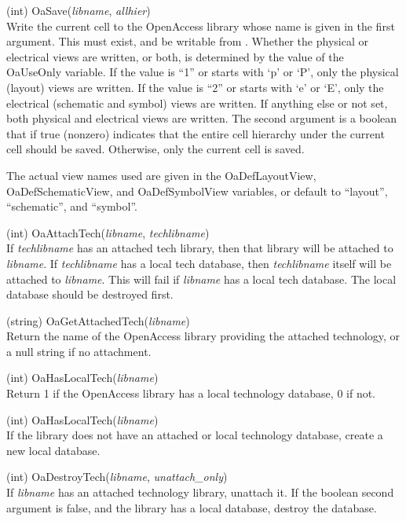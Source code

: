 \begin{description}
\item{(int) \vt OaSave({\it libname\/}, {\it allhier\/})}\\
Write the current cell to the OpenAccess library whose name is given
in the first argument.  This must exist, and be writable from {\Xic}. 
Whether the physical or electrical views are written, or both, is
determined by the value of the {\et OaUseOnly} variable.  If the value
is ``1'' or starts with `p' or `P', only the physical (layout) views
are written.  If the value is ``2'' or starts with `e' or `E', only
the electrical (schematic and symbol) views are written.  If anything
else or not set, both physical and electrical views are written.  The
second argument is a boolean that if true (nonzero) indicates that the
entire cell hierarchy under the current cell should be saved. 
Otherwise, only the current cell is saved.
 
The actual view names used are given in the {\et OaDefLayoutView},
{\et OaDefSchematicView}, and {\et OaDefSymbolView} variables, or
default to ``layout'', ``schematic'', and ``symbol''.

\item{(int) \vt OaAttachTech({\it libname\/}, {\it techlibname\/})}\\
If {\it techlibname} has an attached tech library, then that library
will be attached to {\it libname}.  If {\it techlibname} has a local
tech database, then {\it techlibname} itself will be attached to {\it
libname}.  This will fail if {\it libname} has a local tech database. 
The local database should be destroyed first.

\item{(string) \vt OaGetAttachedTech({\it libname\/})}\\
Return the name of the OpenAccess library providing the attached
technology, or a null string if no attachment.

\item{(int) \vt OaHasLocalTech({\it libname\/})}\\
Return 1 if the OpenAccess library has a local technology database, 0
if not.

\item{(int) \vt OaHasLocalTech({\it libname\/})}\\
If the library does not have an attached or local technology database,
create a new local database.

\item{(int) \vt OaDestroyTech({\it libname\/}, {\it unattach\_only\/})}\\
If {\it libname} has an attached technology library, unattach it.  If
the boolean second argument is false, and the library has a local
database, destroy the database.
\end{description}


